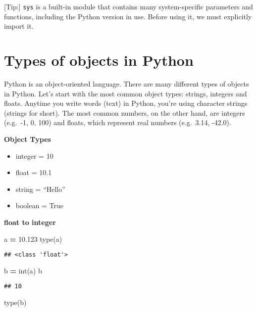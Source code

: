 \documentclass[
]{book}
\newenvironment{Shaded}{\begin{snugshade}}{\end{snugshade}}
\newcommand{\BuiltInTok}[1]{#1}
\newcommand{\FloatTok}[1]{\textcolor[rgb]{0.00,0.00,0.81}{#1}}
\newcommand{\NormalTok}[1]{#1}
\newcommand{\OperatorTok}[1]{\textcolor[rgb]{0.81,0.36,0.00}{\textbf{#1}}}
\providecommand{\tightlist}{%
  \setlength{\itemsep}{0pt}\setlength{\parskip}{0pt}}
\begin{document}
{[}Tip:{]} \texttt{sys} is a built-in module that contains many system-specific parameters and functions, including the Python version in use. Before using it, we must explicitly import it.

\hypertarget{types-of-objects-in-python}{%
\section{Types of objects in Python}\label{types-of-objects-in-python}}

Python is an object-oriented language. There are many different types of objects in Python. Let's start with the most common object types: strings, integers and floats. Anytime you write words (text) in Python, you're using character strings (strings for short). The most common numbers, on the other hand, are integers (e.g.~-1, 0, 100) and floats, which represent real numbers (e.g.~3.14, -42.0).

\textbf{Object Types}

\begin{itemize}
\tightlist
\item
  integer = 10
\item
  float = 10.1
\item
  string = ``Hello''
\item
  boolean = True
\end{itemize}

\textbf{float to integer}

\begin{Shaded}
\begin{Highlighting}[]
\NormalTok{a }\OperatorTok{=} \FloatTok{10.123}
\BuiltInTok{type}\NormalTok{(a)}
\end{Highlighting}
\end{Shaded}

\begin{verbatim}
## <class 'float'>
\end{verbatim}

\begin{Shaded}
\begin{Highlighting}[]
\NormalTok{b }\OperatorTok{=} \BuiltInTok{int}\NormalTok{(a)}
\NormalTok{b}
\end{Highlighting}
\end{Shaded}

\begin{verbatim}
## 10
\end{verbatim}

\begin{Shaded}
\begin{Highlighting}[]
\BuiltInTok{type}\NormalTok{(b)}
\end{Highlighting}
\end{Shaded}
\end{document}
